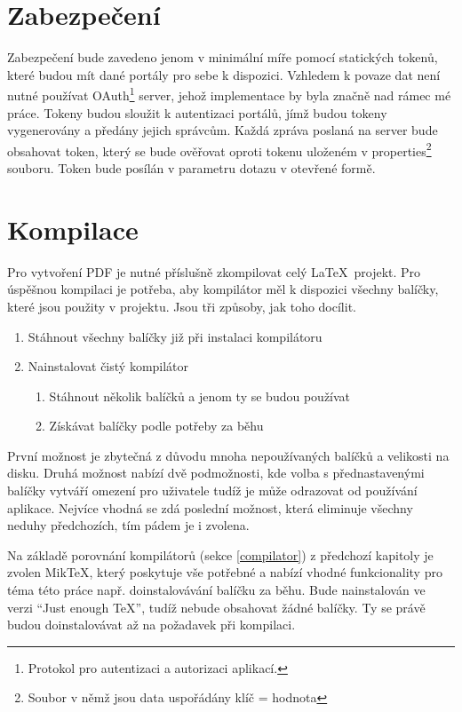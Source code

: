 \section{Zabezpečení}
Zabezpečení bude zavedeno jenom v minimální míře pomocí statických tokenů, které budou mít dané portály pro sebe k dispozici. Vzhledem k povaze dat není nutné používat OAuth\footnote{Protokol pro autentizaci a autorizaci aplikací.} server, jehož implementace by byla značně nad rámec mé práce. Tokeny budou sloužit k autentizaci portálů, jímž budou tokeny vygenerovány a předány jejich správcům. Každá zpráva poslaná na server bude obsahovat token, který se bude ověřovat oproti tokenu uloženém v properties\footnote{Soubor v němž jsou data uspořádány klíč = hodnota} souboru. Token bude posílán v parametru dotazu v otevřené formě. 

\section{Kompilace} \label{compilation}
Pro vytvoření PDF je nutné příslušně zkompilovat celý \LaTeX\ projekt. Pro úspěšnou kompilaci je potřeba, aby kompilátor měl k dispozici všechny balíčky, které jsou použity v projektu. Jsou tři způsoby, jak toho docílit.
\begin{enumerate}
	\item Stáhnout všechny balíčky již při instalaci kompilátoru
	\item Nainstalovat čistý kompilátor
		\begin{enumerate}
			\item Stáhnout několik balíčků a jenom ty se budou používat
			\item Získávat balíčky podle potřeby za běhu
		\end{enumerate}
\end{enumerate}
První možnost je zbytečná z důvodu mnoha nepoužívaných balíčků a velikosti na disku. Druhá možnost nabízí dvě podmožnosti, kde volba s přednastavenými balíčky vytváří omezení pro uživatele tudíž je může odrazovat od používání aplikace. Nejvíce vhodná se zdá poslední možnost, která eliminuje všechny neduhy předchozích, tím pádem je i zvolena.
\par
Na základě porovnání kompilátorů (sekce \ref{compilator}) z předchozí kapitoly je zvolen MikTeX, který poskytuje vše potřebné a nabízí vhodné funkcionality pro téma této práce např. doinstalovávání balíčku za běhu. Bude nainstalován ve verzi \enquote{Just enough TeX}, tudíž nebude obsahovat žádné balíčky. Ty se právě budou doinstalovávat až na požadavek při kompilaci.

